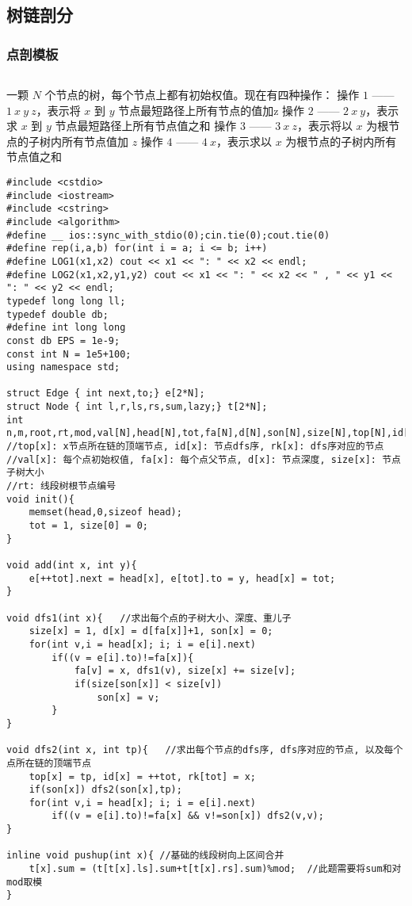 \documentclass[twoside]{article}
\begin{document}
\subsection{树链剖分}
\subsubsection{点剖模板}
\begin{lstlisting}
\end{lstlisting}
一颗 $N$ 个节点的树，每个节点上都有初始权值。现在有四种操作：
操作 $1$ —— $1\ x\ y\ z$，表示将 $x$ 到 $y$ 节点最短路径上所有节点的值加z
操作 $2$ —— $2\ x\ y$，表示求 $x$ 到 $y$ 节点最短路径上所有节点值之和
操作 $3$ —— $3\ x\  z$，表示将以 $x$ 为根节点的子树内所有节点值加 $z$ 
操作 $4$ —— $4\ x$，表示求以 $x$ 为根节点的子树内所有节点值之和
\begin{lstlisting}
#include <cstdio>
#include <iostream>
#include <cstring>
#include <algorithm>
#define __ ios::sync_with_stdio(0);cin.tie(0);cout.tie(0)
#define rep(i,a,b) for(int i = a; i <= b; i++)
#define LOG1(x1,x2) cout << x1 << ": " << x2 << endl;
#define LOG2(x1,x2,y1,y2) cout << x1 << ": " << x2 << " , " << y1 << ": " << y2 << endl;
typedef long long ll;
typedef double db;
#define int long long
const db EPS = 1e-9;
const int N = 1e5+100;
using namespace std;

struct Edge { int next,to;} e[2*N];
struct Node { int l,r,ls,rs,sum,lazy;} t[2*N];
int n,m,root,rt,mod,val[N],head[N],tot,fa[N],d[N],son[N],size[N],top[N],id[N],rk[N];
//top[x]: x节点所在链的顶端节点, id[x]: 节点dfs序, rk[x]: dfs序对应的节点
//val[x]: 每个点初始权值, fa[x]: 每个点父节点, d[x]: 节点深度, size[x]: 节点子树大小
//rt: 线段树根节点编号
void init(){
	memset(head,0,sizeof head);
	tot = 1, size[0] = 0;
}

void add(int x, int y){
	e[++tot].next = head[x], e[tot].to = y, head[x] = tot;
}

void dfs1(int x){	//求出每个点的子树大小、深度、重儿子
	size[x] = 1, d[x] = d[fa[x]]+1, son[x] = 0;
	for(int v,i = head[x]; i; i = e[i].next)
		if((v = e[i].to)!=fa[x]){
			fa[v] = x, dfs1(v), size[x] += size[v];
			if(size[son[x]] < size[v])
				son[x] = v;
		}
}

void dfs2(int x, int tp){	//求出每个节点的dfs序, dfs序对应的节点, 以及每个点所在链的顶端节点
	top[x] = tp, id[x] = ++tot, rk[tot] = x;
	if(son[x]) dfs2(son[x],tp);
	for(int v,i = head[x]; i; i = e[i].next)
		if((v = e[i].to)!=fa[x] && v!=son[x]) dfs2(v,v);
}

inline void pushup(int x){ //基础的线段树向上区间合并
	t[x].sum = (t[t[x].ls].sum+t[t[x].rs].sum)%mod;	 //此题需要将sum和对mod取模
}


\end{lstlisting}
\end{document}
